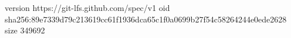 version https://git-lfs.github.com/spec/v1
oid sha256:89e7339d79c213619cc61f1936dca65c1f0a0699b27f54c58264244e0ede2628
size 349692
